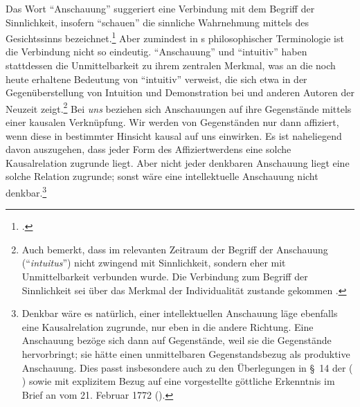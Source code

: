 Das Wort \enquote{Anschauung} suggeriert eine Verbindung mit dem Begriff der
Sinnlichkeit, insofern \enquote{schauen} die sinnliche Wahrnehmung mittels des
Gesichtssinns
bezeichnet.\footnote{\cite[Vgl.][38]{Hintikka:OnKantsNotionofIntuition1969}.}
Aber zumindest in s philosophischer Terminologie ist die
Verbindung nicht so eindeutig.
\enquote{Anschauung} und \enquote{intuitiv} haben stattdessen die
Unmittelbarkeit zu ihrem zentralen Merkmal, was an die noch heute erhaltene
Bedeutung von \enquote{intuitiv} verweist, die sich etwa in der
Gegenüberstellung von Intuition und Demonstration bei
 und anderen Autoren der Neuzeit
zeigt.\footnote{Auch 
bemerkt, dass im relevanten Zeitraum der Begriff der Anschauung
(\enquote{\emph{intuitus}}) nicht zwingend mit Sinnlichkeit, sondern eher mit
Unmittelbarkeit verbunden wurde. Die Verbindung zum Begriff der Sinnlichkeit sei
über das Merkmal der Individualität zustande gekommen
\parencite[vgl.][40--44]{Hintikka:OnKantsNotionofIntuition1969}.}
Bei \emph{uns} beziehen sich Anschauungen auf ihre Gegenstände mittels einer
kausalen Verknüpfung. Wir werden von Gegenständen nur dann affiziert, wenn diese
in bestimmter Hinsicht kausal auf uns einwirken. Es ist naheliegend davon
auszugehen, dass jeder Form des Affiziertwerdens eine solche Kausalrelation
zugrunde liegt. Aber nicht jeder denkbaren Anschauung liegt eine solche
Relation zugrunde; sonst wäre eine intellektuelle Anschauung nicht
denkbar.\footnote{Denkbar wäre es natürlich, einer intellektuellen Anschauung
läge ebenfalls eine Kausalrelation zugrunde, nur eben in die andere Richtung. Eine Anschauung
bezöge sich dann auf Gegenstände, weil sie die Gegenstände hervorbringt; sie
hätte einen unmittelbaren Gegenstandsbezug als produktive Anschauung.
Dies passt insbesondere auch zu den Überlegungen in \S~14 der  \mkbibparens{\cite[vgl.][B
124\,f.,]{Kant:KritikderreinenVernunft2003} \cite[][III:
104.6--17]{Kant:GesammelteWerke1900ff.}} sowie mit explizitem Bezug auf eine
vorgestellte göttliche Erkenntnis im Brief an  vom 21.
Februar 1772 \mkbibparens{\cite[vgl.][X:
130.6--21]{Kant:GesammelteWerke1900ff.}}.}

